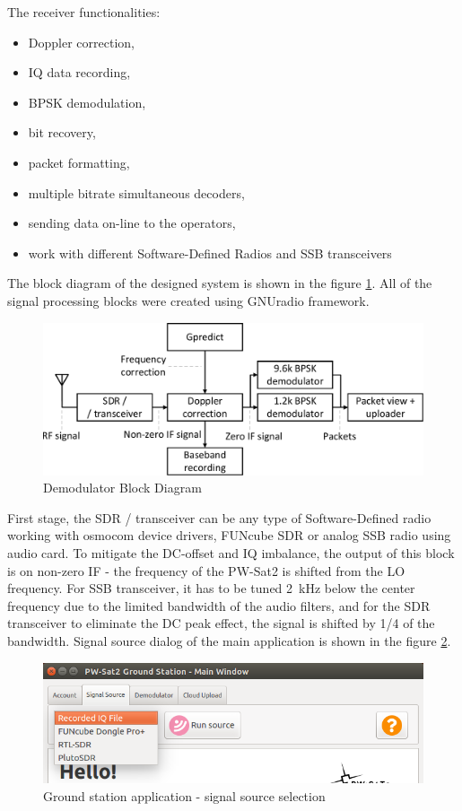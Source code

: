 The receiver  functionalities:
\begin{itemize}
    \item Doppler correction,
    \item IQ data recording,
    \item BPSK demodulation,
    \item bit recovery,
    \item packet formatting,
    \item multiple bitrate simultaneous decoders,
    \item sending data on-line to the operators,
    \item work with different Software-Defined Radios and SSB transceivers
\end{itemize}

The block diagram of the designed system is shown in the figure \ref{demodulator_block_diagram}. All of the signal processing blocks were created using GNUradio framework.

\begin{figure}[H]
    \centering
    \includegraphics[width=0.6\paperwidth]{img/7/demodulator_block_diagram.pdf}
    \caption{Demodulator Block Diagram}
    \label{demodulator_block_diagram}
\end{figure}

First stage, the SDR / transceiver can be any type of Software-Defined radio working with osmocom device drivers, FUNcube SDR or analog SSB radio using audio card. To mitigate the DC-offset and IQ imbalance, the output of this block is on non-zero IF - the frequency of the PW-Sat2 is shifted from the LO frequency. For SSB transceiver, it has to be tuned \SI{2}{\kHz} below the center frequency due to the limited bandwidth of the audio filters, and for the SDR transceiver to eliminate the DC peak effect, the signal is shifted by 1/4 of the bandwidth. Signal source dialog of the main application is shown in the figure \ref{gs_source_selection}.

\begin{figure}[H]
    \centering
    \includegraphics[width=0.6\paperwidth]{img/7/gs_source_selection.png}
    \caption{Ground station application - signal source selection}
    \label{gs_source_selection}
\end{figure}

